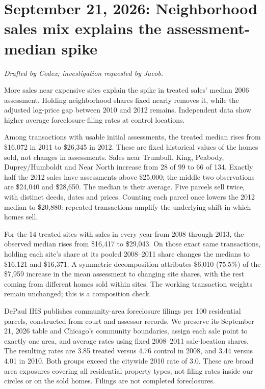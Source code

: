 \section*{September 21, 2026: Neighborhood sales mix explains the assessment-median spike}
\textit{Drafted by Codex; investigation requested by Jacob.}

More sales near expensive sites explain the spike in treated sales' median
2006 assessment. Holding neighborhood shares fixed nearly removes it, while
the adjusted log-price gap between 2010 and 2012 remains. Independent data
show higher average foreclosure-filing rates at control locations.

Among transactions with usable initial assessments, the treated median
rises from \$16,072 in 2011 to \$26,345 in 2012. These are fixed historical
values of the homes sold, not changes in assessments. Sales near Trumbull,
King, Peabody, Duprey/Humboldt and Near North increase from 28 of 99 to
66 of 134. Exactly half the 2012 sales have assessments above \$25,000;
the middle two observations are \$24,040 and \$28,650. The median is their
average. Five parcels sell twice, with distinct deeds, dates and prices.
Counting each parcel once lowers the 2012 median to \$20,880: repeated
transactions amplify the underlying shift in which homes sell.

For the 14 treated sites with sales in every year from 2008 through 2013,
the observed median rises from \$16,417 to \$29,043. On those exact same
transactions, holding each site's share at its pooled 2008--2011 share changes
the medians to \$16,121 and \$16,371. A symmetric decomposition attributes
\$6,010 (75.5\%) of the \$7,959 increase in the mean assessment to changing
site shares, with the rest coming from different homes sold within sites.
The working transaction weights remain unchanged; this is a composition check.

DePaul IHS publishes community-area foreclosure filings per 100 residential
parcels, constructed from court and assessor records. We preserve its
September 21, 2026 table and Chicago's community boundaries, assign each
sale point to exactly one area, and average rates using fixed 2008--2011
sale-location shares. The resulting rates are 3.85 treated versus 4.76 control
in 2008, and 3.44 versus 4.01 in 2010. Both groups exceed the citywide
2010 rate of 3.0. These are broad area exposures covering all residential
property types, not filing rates inside our circles or on the sold homes.
Filings are not completed foreclosures.

